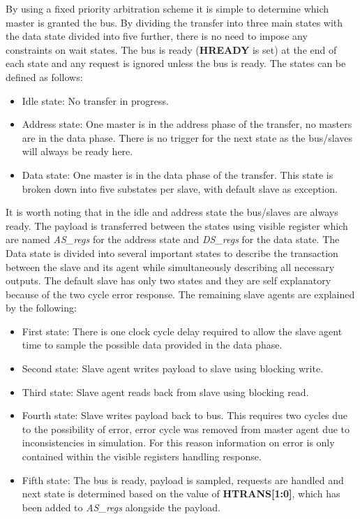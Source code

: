 By using a fixed priority arbitration scheme it is simple to determine which master is granted the bus. By dividing the transfer into three main states with the data state divided into five further, there is no need to impose any constraints on wait states. The bus is ready (\textbf{HREADY} is set) at the end of each state and any request is ignored unless the bus is ready. The states can be defined as follows:
\begin{itemize}
\item Idle state: No transfer in progress.
\item Address state: One master is in the address phase of the transfer, no masters are in the data phase. There is no trigger for the next state as the bus/slaves will always be ready here. 
\item Data state: One master is in the data phase of the transfer. This state is broken down into five substates per slave, with default slave as exception.  
\end{itemize}

It is worth noting that in the idle and address state the bus/slaves are always ready. The payload is transferred between the states using visible register which are named \textit{AS\_regs} for the address state and \textit{DS\_regs} for the data state. The Data state is divided into several important states to describe the transaction between the slave and its agent while simultaneously describing all necessary outputs. The default slave has only two states and they are self explanatory because of the two cycle error response. The remaining slave agents are explained by the following:
\begin{itemize}
 \item First state: There is one clock cycle delay required to allow the slave agent time to sample the possible data provided in the data phase.
 \item Second state: Slave agent writes payload to slave using blocking write. 
 \item Third state: Slave agent reads back from slave using blocking read.
 \item Fourth state: Slave writes payload back to bus. This requires two cycles due to the possibility of error, error cycle was removed from master agent due to inconsistencies in simulation. For this reason information on error is only contained within the visible registers handling response.   
 \item Fifth state: The bus is ready, payload is sampled, requests are handled and next state is determined based on the value of \textbf{HTRANS[1:0]}, which has been added to \textit{AS\_regs} alongside the payload. 
\end{itemize}

